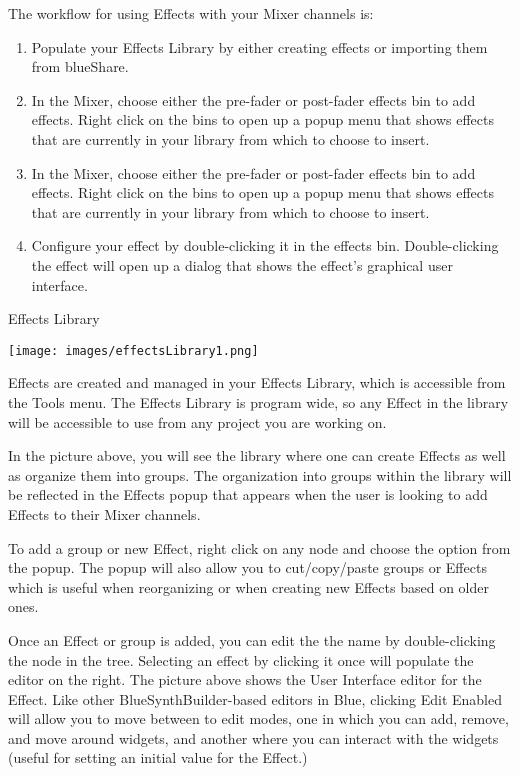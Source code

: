 The workflow for using Effects with your Mixer channels is:

\begin{enumerate}
\def\labelenumi{\arabic{enumi}.}
\item
  Populate your Effects Library by either creating effects or importing
  them from blueShare.
\item
  In the Mixer, choose either the pre-fader or post-fader effects bin to
  add effects. Right click on the bins to open up a popup menu that
  shows effects that are currently in your library from which to choose
  to insert.
\item
  In the Mixer, choose either the pre-fader or post-fader effects bin to
  add effects. Right click on the bins to open up a popup menu that
  shows effects that are currently in your library from which to choose
  to insert.
\item
  Configure your effect by double-clicking it in the effects bin.
  Double-clicking the effect will open up a dialog that shows the
  effect's graphical user interface.
\end{enumerate}

Effects Library

\texttt{[image: images/effectsLibrary1.png]}

Effects are created and managed in your Effects Library, which is
accessible from the Tools menu. The Effects Library is program wide, so
any Effect in the library will be accessible to use from any project you
are working on.

In the picture above, you will see the library where one can create
Effects as well as organize them into groups. The organization into
groups within the library will be reflected in the Effects popup that
appears when the user is looking to add Effects to their Mixer channels.

To add a group or new Effect, right click on any node and choose the
option from the popup. The popup will also allow you to cut/copy/paste
groups or Effects which is useful when reorganizing or when creating new
Effects based on older ones.

Once an Effect or group is added, you can edit the the name by
double-clicking the node in the tree. Selecting an effect by clicking it
once will populate the editor on the right. The picture above shows the
User Interface editor for the Effect. Like other BlueSynthBuilder-based
editors in Blue, clicking Edit Enabled will allow you to move between to
edit modes, one in which you can add, remove, and move around widgets,
and another where you can interact with the widgets (useful for setting
an initial value for the Effect.)


